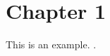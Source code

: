 \documentclass[oneside]{book}
\begin{document}
\clearpage %
\tableofcontents

\clearpage %
\listoffigures

\clearpage %
\listoftables

\mainmatter
% 


\chapter{Chapter 1}
\label{chapter:first}

This is an example. \cite{Sample_book}.

\newpage
% 

\appendix



\backmatter

{}



\end{document}
